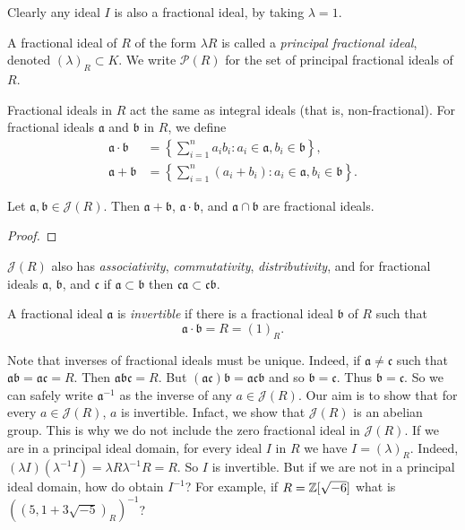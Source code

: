 Clearly any ideal $I$ is also a fractional ideal, by taking $\lambda = 1$.

\begin{definition}
	A fractional ideal of $R$ of the form $\lambda R$ is called a
	\emph{principal fractional ideal}, denoted $(\lambda)_R \subset K$.
	We write $\mathcal P(R)$ for the set of principal fractional ideals
	of $R$.
\end{definition}

Fractional ideals in $R$ act the same as integral ideals
(that is, non-fractional).
For fractional ideals $\mathfrak a$ and $\mathfrak b$ in $R$, we define
\begin{align*}
	\mathfrak a \cdot \mathfrak b &= \left\{
		\sum^{n}_{i=1} a_i b_i : a_i \in \mathfrak a, b_i \in \mathfrak b
	\right\}, \\
	\mathfrak a + \mathfrak b &= \left\{
		\sum^{n}_{i=1} (a_i + b_i): a_i \in \mathfrak a, b_i \in \mathfrak b
	\right\}.
\end{align*}

\begin{lemma}[]
	Let $\mathfrak a, \mathfrak b \in \mathcal J(R)$.
	Then $\mathfrak a + \mathfrak b$, $\mathfrak a \cdot \mathfrak b$, and
	$\mathfrak a \cap \mathfrak b$ are fractional ideals.
\end{lemma}

\begin{proof}
\end{proof}

$\mathcal J(R)$ also has \emph{associativity}, 
\emph{commutativity}, \emph{distributivity}, and
for fractional ideals $\mathfrak a$, $\mathfrak b$, and $\mathfrak c$
if $\mathfrak a \subset \mathfrak b$ then
$\mathfrak c \mathfrak a \subset \mathfrak c \mathfrak b$.

\begin{definition}
	A fractional ideal $\mathfrak a$ is \emph{invertible} if there is a
	fractional ideal $\mathfrak b$ of $R$ such that
	\[
		\mathfrak a \cdot \mathfrak b = R = (1)_R.
	\]
\end{definition}

Note that inverses of fractional ideals must be unique.
Indeed, if $\mathfrak a \neq \mathfrak c$ such that
$\mathfrak{ab} = \mathfrak{ac} = R$.
Then $\mathfrak{abc} = R$.
But $(\mathfrak{ac})\mathfrak b = \mathfrak{acb}$ and so
$\mathfrak b = \mathfrak c$. Thus $\mathfrak b = \mathfrak c$.
So we can safely write $\mathfrak a^{-1}$ as the inverse of any
$a \in \mathcal J(R)$.
Our aim is to show that for every $a \in \mathcal J(R)$, $a$ is invertible.
Infact, we show that $\mathcal J(R)$ is an abelian group.
This is why we do not include the zero fractional ideal in $\mathcal J(R)$.
If we are in a principal ideal domain, for every ideal $I$ in $R$
we have $I = (\lambda)_R$.
Indeed, $(\lambda I)(\lambda^{-1}I) = \lambda R \lambda^{-1} R = R$.
So $I$ is invertible.
But if we are not in a principal ideal domain, how do obtain $I^{-1}$?
For example, if $R = \mathbb{Z}[\sqrt{-6}]$ what is
$\left( 
	(5, 1 + 3\sqrt{-5})_R 
\right)^{-1}$?

